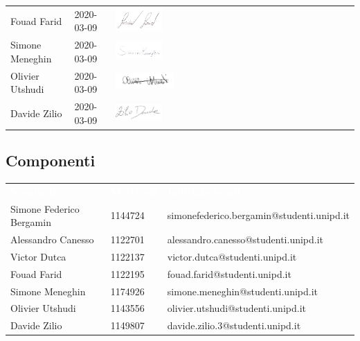 \begin{table}[H]
\begin{center}
\begin{tabular}{ C{5cm} C{4cm} C{6cm}}
		Fouad Farid & 2020-03-09 & \includegraphics[scale=0.2, width=0.2\textwidth]{img/firme/farid.png}\\
		Simone Meneghin & 2020-03-09 & \includegraphics[scale=0.2, width=0.2\textwidth]{img/firme/meneghin.png}\\
		Olivier Utshudi & 2020-03-09 & \includegraphics[scale=0.3, width=0.25\textwidth]{img/firme/outshudi.png}\\
		Davide Zilio & 2020-03-09 & \includegraphics[scale=0.2, width=0.2\textwidth]{img/firme/zilio.png}\\
	\end{tabular}
	\end{center}
\end{table}

\subsection{Componenti}
\begin{table}[H]	
	\begin{center}
	\begin{tabular}{ C{4cm} C{3cm} C{8cm} }
		\textcolor{white}{\textbf{Nominativo}} & \textcolor{white}{\textbf{Matricola}} & \textcolor{white}{\textbf{Indirizzo email}} \\
		Simone Federico Bergamin & 1144724  & simonefederico.bergamin@studenti.unipd.it \\
		Alessandro Canesso & 1122701 & alessandro.canesso@studenti.unipd.it\\
		Victor Dutca & 1122137 & victor.dutca@studenti.unipd.it\\
		Fouad Farid & 1122195 & fouad.farid@studenti.unipd.it\\
		Simone Meneghin & 1174926 & simone.meneghin@studenti.unipd.it\\
		Olivier Utshudi & 1143556 & olivier.utshudi@studenti.unipd.it\\
		Davide Zilio & 1149807 & davide.zilio.3@studenti.unipd.it\\
	\end{tabular}
	\end{center}
\end{table}